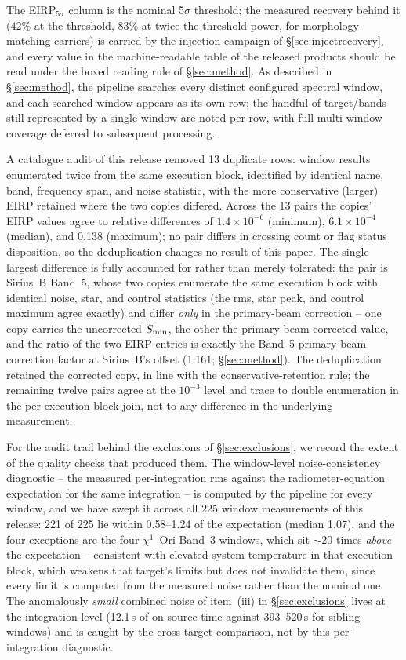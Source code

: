 \documentclass{openjournal}
\begin{document}
The EIRP$_{5\sigma}$ column is the nominal 5$\sigma$ threshold; the
measured recovery behind it ($42$\% at the threshold, $83$\% at
twice the threshold power, for morphology-matching carriers) is
carried by the injection campaign of \S\ref{sec:injectrecovery}, and
every value in the machine-readable
table of the released products should be read under the boxed reading rule
of \S\ref{sec:method}. As described in \S\ref{sec:method}, the pipeline
searches every distinct configured
spectral window, and each searched window appears as its
own row; the handful of target/bands still represented by a single
window are noted per row, with full multi-window coverage deferred to
subsequent processing.

A catalogue audit of this release removed 13 duplicate rows: window
results enumerated twice from the same execution block, identified by
identical name, band, frequency span, and noise statistic, with the
more conservative (larger) EIRP retained where the two copies differed.
Across the 13 pairs the copies' EIRP values agree to relative
differences of $1.4\times10^{-6}$ (minimum), $6.1\times10^{-4}$
(median), and 0.138 (maximum); no pair differs in crossing count or
flag status
disposition, so the deduplication changes no result of this paper. The
single largest difference is fully accounted for rather than merely
tolerated: the pair is Sirius~B Band~5, whose two copies enumerate the
same execution block with identical noise, star, and control
statistics (the rms, star peak, and control maximum agree exactly) and
differ \emph{only} in the primary-beam correction -- one copy carries
the uncorrected $S_{\rm min}$, the other the primary-beam-corrected
value, and the ratio of the two EIRP entries is exactly the Band~5
primary-beam correction factor at Sirius~B's offset (1.161;
\S\ref{sec:method}). The deduplication retained the corrected copy, in
line with the conservative-retention rule; the remaining twelve pairs
agree at the $10^{-3}$ level and trace to double enumeration in the
per-execution-block join, not to any difference in the underlying
measurement.

For the audit trail behind the exclusions of \S\ref{sec:exclusions}, we
record the extent of the quality checks that produced them. The
window-level noise-consistency diagnostic -- the measured
per-integration rms against the radiometer-equation expectation for the
same integration -- is computed by the pipeline for every window, and
we have swept it across all 225 window measurements of this release:
221 of 225 lie within 0.58--1.24 of the expectation (median 1.07), and
the four exceptions are the four $\chi^{1}$~Ori Band~3 windows, which
sit $\sim$20 times \emph{above} the expectation -- consistent with
elevated system temperature in that execution block, which weakens that
target's limits but does not invalidate them, since every limit is
computed from the measured noise rather than the nominal one. The
anomalously \emph{small} combined noise of item~(iii) in
\S\ref{sec:exclusions} lives at the integration level (12.1\,s of
on-source time against 393--520\,s for sibling windows) and is caught
by the cross-target comparison, not by this per-integration diagnostic.
\end{document}

